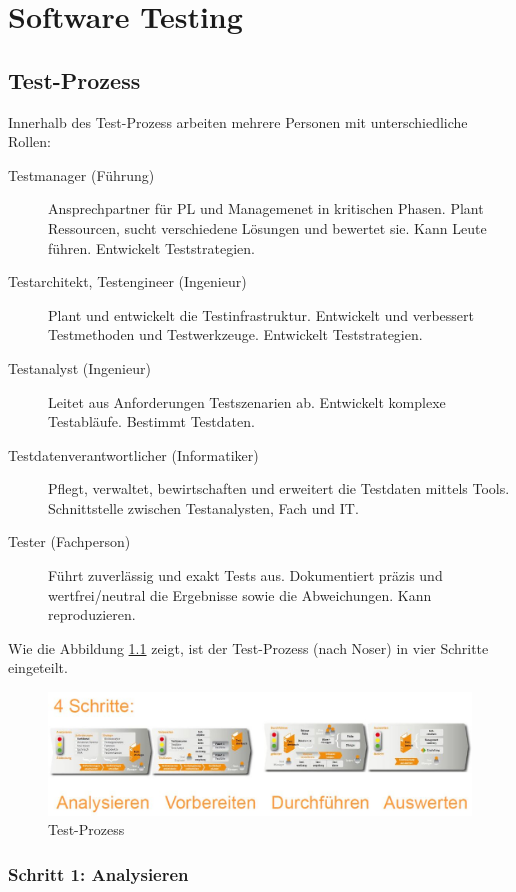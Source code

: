 \chapter{Software Testing}

\section{Test-Prozess}

Innerhalb des Test-Prozess arbeiten mehrere Personen mit unterschiedliche Rollen:

\begin{description}
	\item[Testmanager (Führung)] Ansprechpartner für PL und Managemenet in kritischen Phasen. Plant Ressourcen, sucht verschiedene Lösungen und bewertet sie. Kann Leute führen. Entwickelt Teststrategien.
	\item[Testarchitekt, Testengineer (Ingenieur)] Plant und entwickelt die Testinfrastruktur. Entwickelt und verbessert Testmethoden und Testwerkzeuge. Entwickelt Teststrategien.
	\item[Testanalyst (Ingenieur)] Leitet aus Anforderungen Testszenarien ab. Entwickelt komplexe Testabläufe. Bestimmt Testdaten.
	\item[Testdatenverantwortlicher (Informatiker)] Pflegt, verwaltet, bewirtschaften und erweitert die Testdaten mittels Tools. Schnittstelle zwischen Testanalysten, Fach und IT. 
	\item[Tester (Fachperson)] Führt zuverlässig und exakt Tests aus. Dokumentiert präzis und wertfrei/neutral die Ergebnisse sowie die Abweichungen. Kann reproduzieren.
\end{description}

Wie die Abbildung \ref{fig:test-prozess} zeigt, ist der Test-Prozess (nach Noser) in vier Schritte eingeteilt.

\begin{figure}[h!]
\centering
\includegraphics[width=0.7\linewidth]{fig/test-prozess}
\caption{Test-Prozess}
\label{fig:test-prozess}
\end{figure}

\subsection{Schritt 1: Analysieren}

